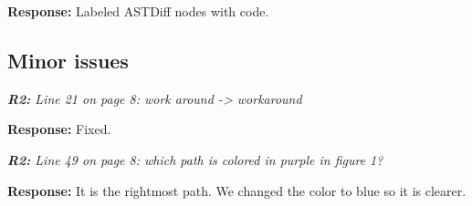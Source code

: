 \documentclass{article}
\begin{document}
\vspace*{1em} \noindent \textbf{Response:} Labeled ASTDiff nodes with code. 

\subsection{Minor issues}

\textit{\textbf{R2:} Line 21 on page 8: work around -> workaround}

\vspace*{1em} \noindent \textbf{Response:} Fixed.

\vspace*{1em} \noindent \textit{\textbf{R2:} Line 49 on page 8: which path is colored in purple in figure 1?}

\vspace*{1em} \noindent \textbf{Response:} It is the rightmost path. We changed the color to blue so it is clearer.

\small


\end{document}
